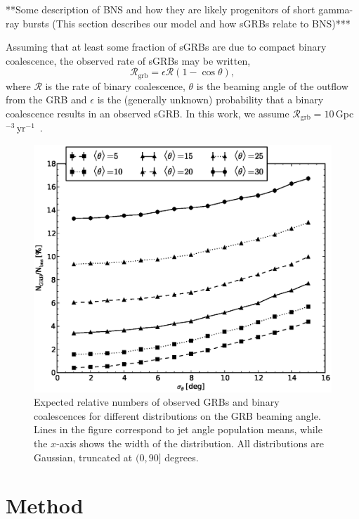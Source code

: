 \documentclass[twocolumn,nofootinbib]{revtex4-1}
\newcommand{\grbrate}{{{\mathcal R}_{\mathrm{grb}}}}
\newcommand{\cbcrate}{{{\mathcal R}}}
\begin{document}
**Some description of BNS and how they are likely progenitors of short
gamma-ray bursts (This section describes our model and how sGRBs relate to BNS)***

Assuming that at least some fraction of sGRBs are due to compact binary
coalescence, the observed rate of sGRBs may be written,
%
\begin{equation}\label{eq:rate2angle}
\grbrate=\epsilon\cbcrate(1-\cos \theta),
\end{equation}
%
where $\cbcrate$ is the rate of binary coalescence, $\theta$ is the beaming
angle of the outflow from the GRB and $\epsilon$ is the (generally unknown)
probability that a binary coalescence results in an observed sGRB.  In this
work, we assume
$\grbrate=10$\,Gpc$^{-3}$\,yr$^{-1}$~\cite{nakar-2007,Dietz11}.
 

\begin{figure}
\centering
\includegraphics[width=\linewidth]{theta_dist_grbfrac.eps}
\caption{\label{fig:thetapopulation} Expected relative
numbers of observed GRBs and binary coalescences for different distributions
on the GRB beaming angle.  Lines in the figure correspond to jet angle
population means, while the $x$-axis shows the width of the distribution.  All 
distributions are Gaussian, truncated at $(0, 90]$ degrees.}
\end{figure}


\section{Method}
\end{document}
